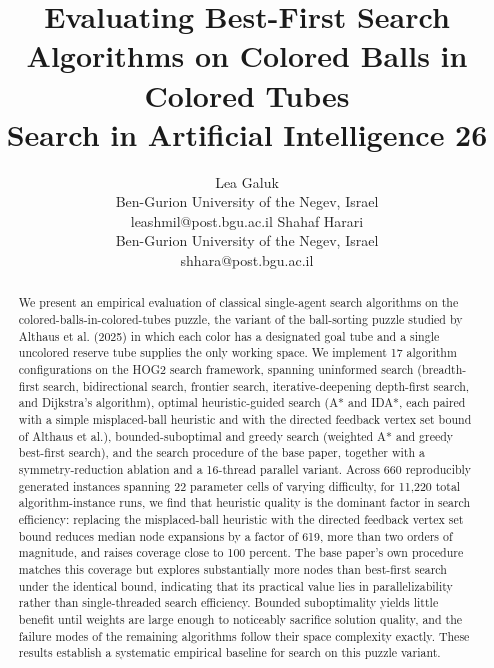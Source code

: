\documentclass[letterpaper]{article}
\title{Evaluating Best-First Search Algorithms on Colored Balls in Colored Tubes \\[4pt]
\large Search in Artificial Intelligence 26}
\author{
Lea Galuk\\
{\rm Ben-Gurion University of the Negev, Israel}\\
{\rm leashmil@post.bgu.ac.il}
\And
Shahaf Harari\\
{\rm Ben-Gurion University of the Negev, Israel}\\
{\rm shhara@post.bgu.ac.il}
}
\begin{document}
\maketitle

\begin{abstract}
We present an empirical evaluation of classical single-agent search algorithms on the colored-balls-in-colored-tubes puzzle, the variant of the ball-sorting puzzle studied by Althaus et al. (2025) in which each color has a designated goal tube and a single uncolored reserve tube supplies the only working space. We implement 17 algorithm configurations on the HOG2 search framework, spanning uninformed search (breadth-first search, bidirectional search, frontier search, iterative-deepening depth-first search, and Dijkstra's algorithm), optimal heuristic-guided search (A* and IDA*, each paired with a simple misplaced-ball heuristic and with the directed feedback vertex set bound of Althaus et al.), bounded-suboptimal and greedy search (weighted A* and greedy best-first search), and the search procedure of the base paper, together with a symmetry-reduction ablation and a 16-thread parallel variant. Across 660 reproducibly generated instances spanning 22 parameter cells of varying difficulty, for 11,220 total algorithm-instance runs, we find that heuristic quality is the dominant factor in search efficiency: replacing the misplaced-ball heuristic with the directed feedback vertex set bound reduces median node expansions by a factor of 619, more than two orders of magnitude, and raises coverage close to 100 percent. The base paper's own procedure matches this coverage but explores substantially more nodes than best-first search under the identical bound, indicating that its practical value lies in parallelizability rather than single-threaded search efficiency. Bounded suboptimality yields little benefit until weights are large enough to noticeably sacrifice solution quality, and the failure modes of the remaining algorithms follow their space complexity exactly. These results establish a systematic empirical baseline for search on this puzzle variant.
\end{abstract}
\end{document}
